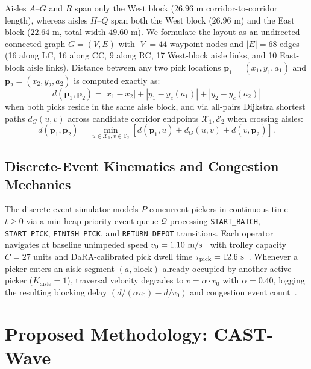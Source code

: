 \documentclass[conference]{IEEEtran}
\begin{document}
Aisles $A$--$G$ and $R$ span only the West block ($26.96\text{ m}$ corridor-to-corridor length), whereas aisles $H$--$Q$ span both the West block ($26.96\text{ m}$) and the East block ($22.64\text{ m}$, total width $49.60\text{ m}$). We formulate the layout as an undirected connected graph $G = (V, E)$ with $|V| = 44$ waypoint nodes and $|E| = 68$ edges (16 along LC, 16 along CC, 9 along RC, 17 West-block aisle links, and 10 East-block aisle links). Distance between any two pick locations $\mathbf{p}_1 = (x_1, y_1, a_1)$ and $\mathbf{p}_2 = (x_2, y_2, a_2)$ is computed exactly as:
\begin{equation}
\label{eq:dist_intra}
d(\mathbf{p}_1, \mathbf{p}_2) = |x_1 - x_2| + |y_1 - y_c(a_1)| + |y_2 - y_c(a_2)|
\end{equation}
when both picks reside in the same aisle block, and via all-pairs Dijkstra shortest paths $d_G(u, v)$ across candidate corridor endpoints $\mathcal{X}_1, \mathcal{E}_2$ when crossing aisles:
\begin{equation}
\label{eq:dist_inter}
d(\mathbf{p}_1, \mathbf{p}_2) = \min_{u \in \mathcal{X}_1, v \in \mathcal{E}_2} \left[ d(\mathbf{p}_1, u) + d_G(u, v) + d(v, \mathbf{p}_2) \right].
\end{equation}

\subsection{Discrete-Event Kinematics and Congestion Mechanics}
\label{sec:des_engine}
The discrete-event simulator models $P$ concurrent pickers in continuous time $t \ge 0$ via a min-heap priority event queue $\mathcal{Q}$ processing \texttt{START\_BATCH}, \texttt{START\_PICK}, \texttt{FINISH\_PICK}, and \texttt{RETURN\_DEPOT} transitions. Each operator navigates at baseline unimpeded speed $v_0 = 1.10\text{ m/s}$~\cite{franzke2017congestion} with trolley capacity $C = 27$ units and DaRA-calibrated pick dwell time $\tau_{\text{pick}} = 12.6\text{ s}$~\cite{niemann2026dara}. Whenever a picker enters an aisle segment $(a, \text{block})$ already occupied by another active picker ($K_{\text{aisle}} = 1$), traversal velocity degrades to $v = \alpha \cdot v_0$ with $\alpha = 0.40$, logging the resulting blocking delay $(d/(\alpha v_0) - d/v_0)$ and congestion event count~\cite{koreis2026side}.

\section{Proposed Methodology: CAST-Wave}
\label{sec:methodology}
\end{document}

